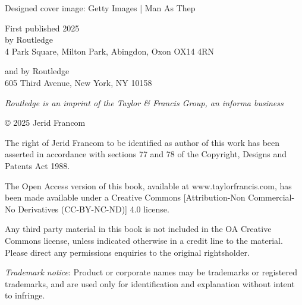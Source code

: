 \documentclass[
  letterpaper,
  krantz1]{latex/krantz-mod}
\theoremstyle{definition}
\theoremstyle{definition}
\theoremstyle{remark}
\begin{document}
\maketitle
\setcounter{page}{4} %




\thispagestyle{empty}



Designed cover image: Getty Images | Man As Thep

First published 2025\\
by Routledge\\
4 Park Square, Milton Park, Abingdon, Oxon OX14 4RN

and by Routledge\\
605 Third Avenue, New York, NY 10158

\textit{Routledge is an imprint of the Taylor \& Francis Group, an informa business}

© 2025 Jerid Francom

The right of Jerid Francom to be identified as author of this work has been asserted in accordance with sections 77 and 78 of the Copyright, Designs and Patents Act 1988.

The Open Access version of this book, available at www.taylorfrancis.com, has been made available under a Creative Commons [Attribution-Non Commercial-No Derivatives (CC-BY-NC-ND)] 4.0 license.

Any third party material in this book is not included in the OA Creative Commons license, unless indicated otherwise in a credit line to the material. Please direct any permissions enquiries to the original rightsholder.

\textit{Trademark notice}: Product or corporate names may be trademarks or registered trademarks, and are used only for identification and explanation without intent to infringe.
\end{document}

